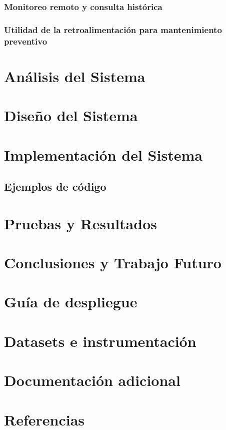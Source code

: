 ﻿\documentclass[12pt,openright,oneside]{report}
\theoremstyle{mytheoremstyle}
\theoremstyle{mytheoremstyle}
\theoremstyle{myproblemstyle}
\begin{document}
\subsection{Monitoreo remoto y consulta histórica}
\subsection{Utilidad de la retroalimentación para mantenimiento preventivo}

\chapter{Análisis del Sistema}    %

\chapter{Diseño del Sistema}   %

\chapter{Implementación del Sistema}    %
\section{Ejemplos de código}

\chapter{Pruebas y Resultados}     %

\chapter{Conclusiones y Trabajo Futuro}     %

\appendix
\chapter{Guía de despliegue}
\chapter{Datasets e instrumentación}
\chapter{Documentación adicional}

\clearpage
\chapter*{Referencias}
\printbibliography[heading=none]
\end{document}
